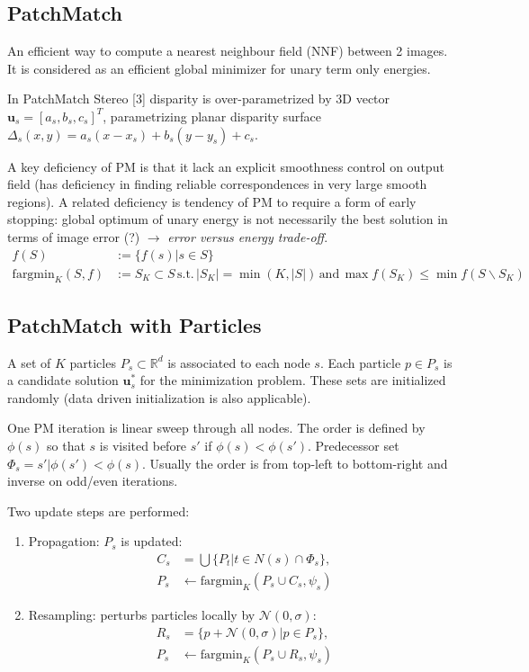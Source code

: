 \documentclass[a4paper,12pt]{article}
\begin{document}
\subsection*{PatchMatch}
An efficient way to compute a nearest neighbour field (NNF) between 2 images. It is considered as an efficient global minimizer for unary term only energies.

In PatchMatch Stereo [3] disparity is over-parametrized by 3D vector $\mathbf{u}_s = [ a_s, b_s, c_s ]^T$, parametrizing planar disparity surface $\Delta_s(x,y)=a_s(x-x_s)+b_s(y-y_s)+c_s$. 

A key deficiency of PM is that it lack an explicit smoothness control on output field (has deficiency in finding reliable correspondences in very large smooth regions).
A related deficiency is tendency of PM to require a form of early stopping: global optimum of unary energy is not necessarily the best solution in terms of image error (?) $\rightarrow$ \textit{error versus energy trade-off}. 
\begin{align*}
f(S) &:= \{f(s)|s \in S\} \\
\text{fargmin}_K(S,f) &:= S_K \subset S \, \text{s.t.} \, |S_K| = \min(K,|S|) \,\text{and}\, \max f(S_K) \leq \min f(S \backslash S_K)
\end{align*}

\subsection{PatchMatch with Particles}
A set of $K$ particles $P_s \subset \mathbb{R}^d$ is associated to each node $s$. Each particle $p \in P_s$ is a candidate solution $\mathbf{u}_s^{*}$ for the minimization problem. These sets are initialized randomly (data driven initialization is also applicable).

One PM iteration is linear sweep through all nodes. The order is defined by $\phi(s)$ so that $s$ is visited before $s'$ if $\phi(s) < \phi(s')$. Predecessor set $\Phi_s = {s'|\phi(s') < \phi(s)}$. Usually the order is from top-left to bottom-right and inverse on odd/even iterations.

Two update steps are performed:
\begin{enumerate}
\item Propagation: $P_s$ is updated: 
\begin{align*}
C_s &= \bigcup \lbrace P_t | t \in N(s) \cap \Phi_s \rbrace,\\ 
P_s &\leftarrow \text{fargmin}_K (P_s \cup C_s, \psi_s)
\end{align*}
\item Resampling: perturbs particles locally by $\mathcal{N}(0,\sigma)$:
\begin{align*}
R_s &= \lbrace p + \mathcal{N}(0,\sigma) | p \in P_s \rbrace, \\
P_s &\leftarrow \text{fargmin}_K (P_s \cup R_s, \psi_s)
\end{align*}
\end{enumerate}
\end{document}
